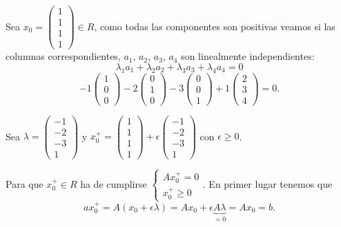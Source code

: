 \begin{solucion}
Sea $x_0=\left(\begin{array}{c}
1\\1\\1\\1
\end{array}\right)\in R$, como todas las componentes son positivas veamos si las columnas correspondientes, $a_1$, $a_2$, $a_3$, $a_4$ son linealmente independientes:
$$
\lambda_1a_1+\lambda_2a_2+\lambda_3a_3+\lambda_4a_4= 0
$$
$$
-1\left(
\begin{array}{c}1\\0\\0\end{array}
\right)
-2\left(
\begin{array}{c}0\\1\\0\end{array}
\right)
-3\left(
\begin{array}{c}0\\0\\1\end{array}
\right)
+1\left(
\begin{array}{c}2\\3\\4\end{array}
\right)
 =  0.$$

Sea $\lambda=\left(
\begin{array}{r}
-1\\-2\\-3\\1
\end{array}
\right)$ y $x_0^+=\left(\begin{array}{c}
1\\1\\1\\1
\end{array}\right)+\epsilon\left(
\begin{array}{r}
-1\\-2\\-3\\1
\end{array}
\right)$ con $\epsilon\ge0$. 

Para que $x_0^+\in R$ ha de cumplirse $\left\{\begin{array}{r}
Ax_0^+=0\\x_0^+\ge0
\end{array}\right.$. En primer lugar tenemos que
$$ax_0^+=A(x_0+\epsilon\lambda)=Ax_0+\epsilon\underbrace{A\lambda}_{\text{$=0$}}=Ax_0=b.$$


\end{solucion}
